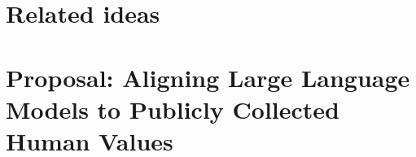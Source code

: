 \documentclass[11pt, a4paper, twoside, openright]{report}
\begin{document}
\backmatter
%
\printbibliography

\appendix

\chapter{Related ideas}


\chapter{Proposal: Aligning Large Language Models to Publicly Collected Human Values}


\end{document}
